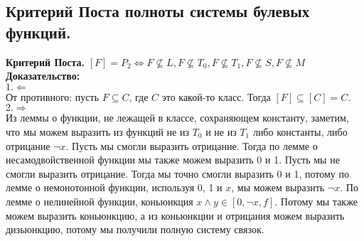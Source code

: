 \subsection{Критерий Поста полноты системы булевых функций.}
\textbf{Критерий Поста.} $[F] = P_2 \Leftrightarrow F \nsubseteq L, F \nsubseteq T_0, F \nsubseteq T_1, F \nsubseteq S, F \nsubseteq M$\\

\noindent \textbf{Доказательство:}\\

$1. \Leftarrow$\\

От противного: пусть $F \subseteq C$, где $C$ это какой-то класс. Тогда $[F] \subseteq [C] = C$.\\

$2. \Rightarrow$\\

Из леммы о функции, не лежащей в классе, сохраняющем константу, заметим, что мы можем выразить из функций не из $T_0$ и не из $T_1$ либо константы, либо отрицание $\neg x$. Пусть мы смогли выразить отрицание. Тогда по лемме о несамодвойственной функции мы также можем выразить 0 и 1. Пусть мы не смогли выразить отрицание. Тогда мы точно смогли выразить 0 и 1, потому по лемме о немонотонной функции, используя 0, 1 и $x$, мы можем выразить $\neg x$.
По лемме о нелинейной функции, коньюнкция $x \wedge y \in [0, \neg x, f]$. Потому мы также можем выразить коньюнкцию, а из коньюнкции и отрицания можем выразить дизьюнкцию, потому мы получили полную систему связок.
